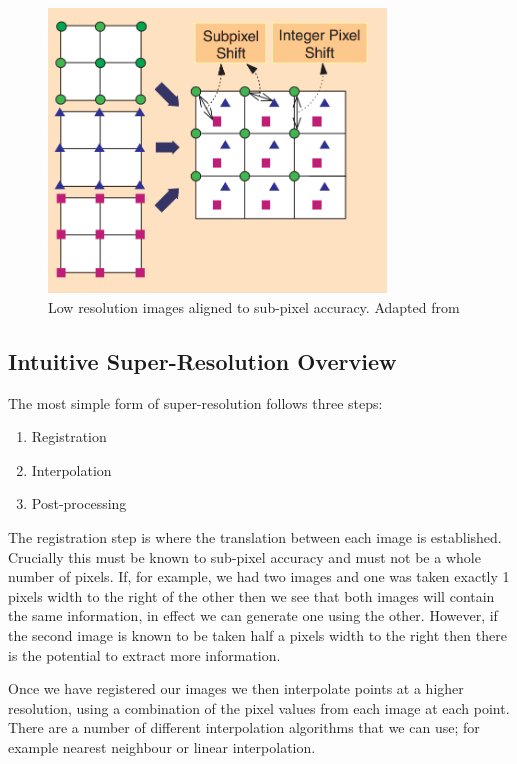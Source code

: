 \begin{figure}[H]
    \centering
	\includegraphics[width=0.8\textwidth]{images/background/super_resolution.png}
    \caption{Low resolution images aligned to sub-pixel accuracy. Adapted from \cite{superresolution2}}
    \label{fig:superresolution}
\end{figure}

\subsection*{Intuitive Super-Resolution Overview}
The most simple form of super-resolution follows three steps:

\begin{enumerate}
	\item Registration
	\item Interpolation
	\item Post-processing
\end{enumerate}

The registration step is where the translation between each image is established. Crucially this must be known to sub-pixel accuracy and must not be a whole number of pixels. If, for example, we had two images and one was taken exactly 1 pixels width to the right of the other then we see that both images will contain the same information, in effect we can generate one using the other. However, if the second image is known to be taken half a pixels width to the right then there is the potential to extract more information.

Once we have registered our images we then interpolate points at a higher resolution, using a combination of the pixel values from each image at each point. There are a number of different interpolation algorithms that we can use; for example nearest neighbour or linear interpolation.

